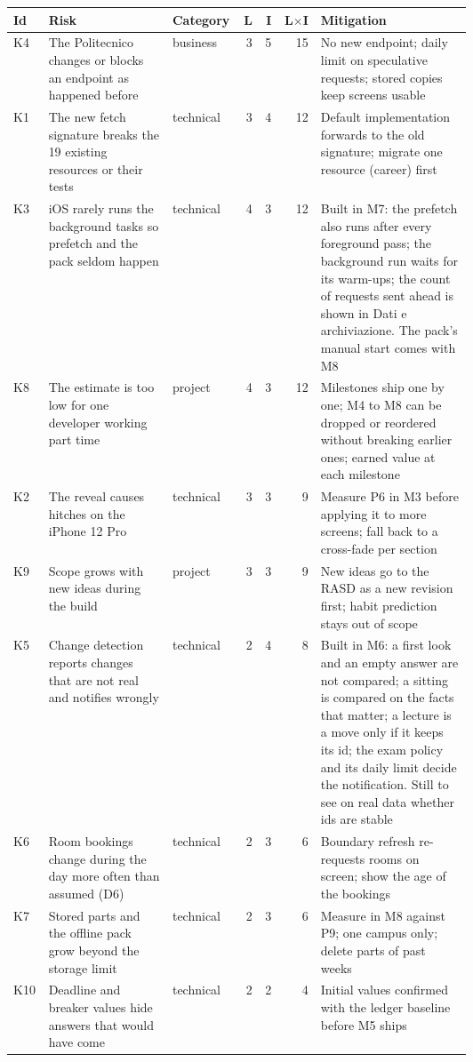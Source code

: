 {\small
\begin{longtable}{@{}l p{0.27\linewidth} l r r r p{0.33\linewidth}@{}}
\toprule Id & Risk & Category & L & I & L$\times$I & Mitigation \\ \midrule
\endhead
K4 & The Politecnico changes or blocks an endpoint as happened before & business & 3 & 5 & 15 & No new endpoint; daily limit on speculative requests; stored copies keep screens usable \\
K1 & The new fetch signature breaks the 19 existing resources or their tests & technical & 3 & 4 & 12 & Default implementation forwards to the old signature; migrate one resource (career) first \\
K3 & iOS rarely runs the background tasks so prefetch and the pack seldom happen & technical & 4 & 3 & 12 & Built in M7: the prefetch also runs after every foreground pass; the background run waits for its warm-ups; the count of requests sent ahead is shown in Dati e archiviazione. The pack's manual start comes with M8 \\
K8 & The estimate is too low for one developer working part time & project & 4 & 3 & 12 & Milestones ship one by one; M4 to M8 can be dropped or reordered without breaking earlier ones; earned value at each milestone \\
K2 & The reveal causes hitches on the iPhone 12 Pro & technical & 3 & 3 & 9 & Measure P6 in M3 before applying it to more screens; fall back to a cross-fade per section \\
K9 & Scope grows with new ideas during the build & project & 3 & 3 & 9 & New ideas go to the RASD as a new revision first; habit prediction stays out of scope \\
K5 & Change detection reports changes that are not real and notifies wrongly & technical & 2 & 4 & 8 & Built in M6: a first look and an empty answer are not compared; a sitting is compared on the facts that matter; a lecture is a move only if it keeps its id; the exam policy and its daily limit decide the notification. Still to see on real data whether ids are stable \\
K6 & Room bookings change during the day more often than assumed (D6) & technical & 2 & 3 & 6 & Boundary refresh re-requests rooms on screen; show the age of the bookings \\
K7 & Stored parts and the offline pack grow beyond the storage limit & technical & 2 & 3 & 6 & Measure in M8 against P9; one campus only; delete parts of past weeks \\
K10 & Deadline and breaker values hide answers that would have come & technical & 2 & 2 & 4 & Initial values confirmed with the ledger baseline before M5 ships \\
\bottomrule
\end{longtable}}
